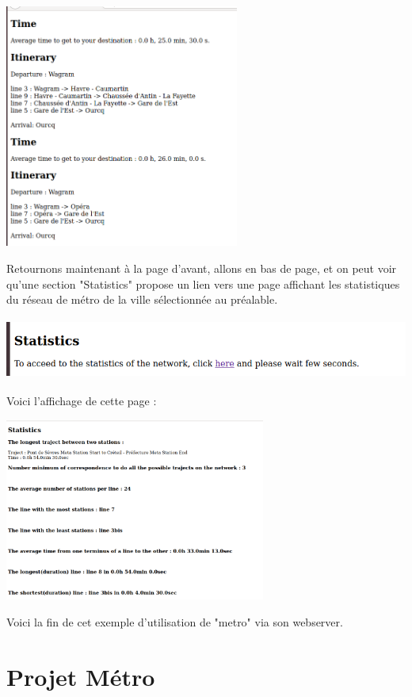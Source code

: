 \documentclass[12pt,french]{article}
\begin{document}
\includegraphics[height=8cm]{images/itineraryWithPbs.png}

Retournons maintenant à la page d'avant, allons en bas de page, et on peut voir qu'une section "Statistics" propose un lien vers une page affichant les statistiques du réseau de métro de la ville sélectionnée au préalable.

\includegraphics[height=2cm]{images/acceedStats.png}

Voici l'affichage de cette page :

\includegraphics[height=6cm]{images/stats.png} 

Voici la fin de cet exemple d'utilisation de "metro" via son webserver.


 
\newpage

\part{Projet Métro}
\end{document}

